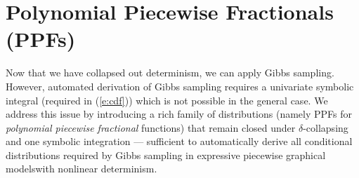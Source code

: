 \documentclass[letterpaper]{article}
\begin{document}
\section{Polynomial Piecewise Fractionals 
(PPFs)}
\label{sect:ppfs}
Now that we have collapsed out determinism, we can apply Gibbs sampling. However, automated derivation of Gibbs sampling requires a univariate symbolic integral (required in (\ref{e:cdf})) which is not possible in the general case.
We address this issue by introducing a rich family of distributions (namely PPFs for \emph{polynomial piecewise fractional} functions) that remain closed under $\delta$-collapsing and one symbolic integration --- sufficient to automatically derive all conditional distributions required by Gibbs sampling in expressive piecewise graphical modelswith nonlinear determinism.  
\end{document}
